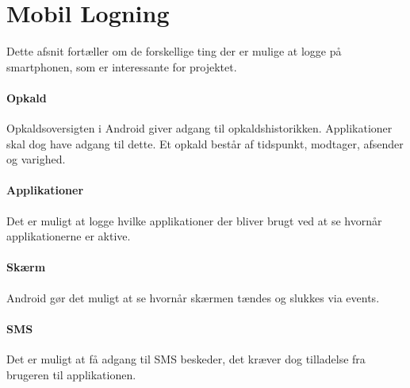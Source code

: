 \section{Mobil Logning}\label{logning}
Dette afsnit fortæller om de forskellige ting der er mulige at logge på smartphonen, som er interessante for projektet.

\paragraph{Opkald}
Opkaldsoversigten i Android giver adgang til opkaldshistorikken.
Applikationer skal dog have adgang til dette.
Et opkald består af tidspunkt, modtager, afsender og varighed.

\paragraph{Applikationer}
Det er muligt at logge hvilke applikationer der bliver brugt ved at se hvornår applikationerne er aktive.

\paragraph{Skærm}
Android gør det muligt at se hvornår skærmen tændes og slukkes via events.  

\paragraph{SMS}
Det er muligt at få adgang til SMS beskeder, det kræver dog tilladelse fra brugeren til applikationen.